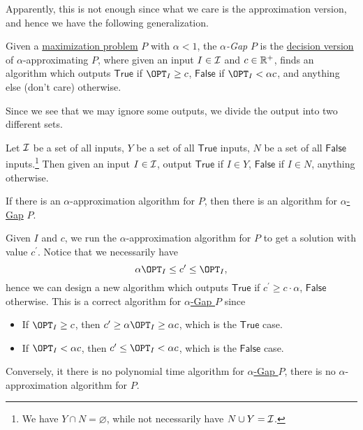 Apparently, this is not enough since what we care is the approximation version, and hence we have the following generalization.

\begin{definition}\label{def:Gap}
	Given a \hyperref[def:combinatorial-optimization]{maximization problem} \(P\) with \(\alpha < 1\), the \emph{\(\alpha \)-Gap} \(P\) is the \hyperref[def:decision-P]{decision version} of \(\alpha\)-approximating \(P\), where given an input \(I\in \mathcal{\MakeUppercase{i}} \) and \(c\in \mathbb{\MakeUppercase{r}} ^+\), finds an algorithm which outputs \(\textsf{True}\) if \(\OPT_I \geq c\), \(\textsf{False}\) if \(\OPT_I < \alpha c\), and anything else (don't care) otherwise.
\end{definition}

Since we see that we may ignore some outputs, we divide the output into two different sets.

\begin{notation}
	Let \(\mathcal{\MakeUppercase{i}} \) be a set of all inputs, \(Y\) be a set of all \(\textsf{True}\) inputs, \(N\) be a set of all \(\textsf{False}\) inputs.\footnote{We have \(Y \cap N = \varnothing \), while not necessarily have \(N \cup Y = \mathcal{\MakeUppercase{i}} \).} Then given an input \(I\in \mathcal{\MakeUppercase{i}} \), output \(\textsf{True}\) if \(I\in Y\), \(\textsf{False}\) if \(I\in N\), anything otherwise.
\end{notation}

\begin{remark}
	If there is an \(\alpha \)-approximation algorithm for \(P\), then there is an algorithm for \hyperref[def:Gap]{\(\alpha\)-Gap} \(P\).
\end{remark}
\begin{explanation}
	Given \(I\) and \(c\), we run the \(\alpha \)-approximation algorithm for \(P\) to get a solution with value \(c^\prime \). Notice that we necessarily have
	\[
		\alpha \OPT_I \leq c^\prime \leq \OPT_I,
	\]
	hence we can design a new algorithm which outputs \(\textsf{True}\) if \(c^\prime \geq c \cdot \alpha \), \(\textsf{False}\) otherwise. This is a correct algorithm for \hyperref[def:Gap]{\(\alpha \)-Gap \(P\)} since
	\begin{itemize}
		\item If \(\OPT_I \geq c\), then \(c^\prime \geq \alpha \OPT_I \geq \alpha c\), which is the \(\textsf{True}\) case.
		\item If \(\OPT_I < \alpha c\), then \(c^\prime \leq \OPT_I < \alpha c\), which is the \(\textsf{False}\) case.
	\end{itemize}

	Conversely, it there is no polynomial time algorithm for \hyperref[def:Gap]{\(\alpha \)-Gap \(P\)}, there is no \(\alpha \)-approximation algorithm for \(P\).
\end{explanation}

